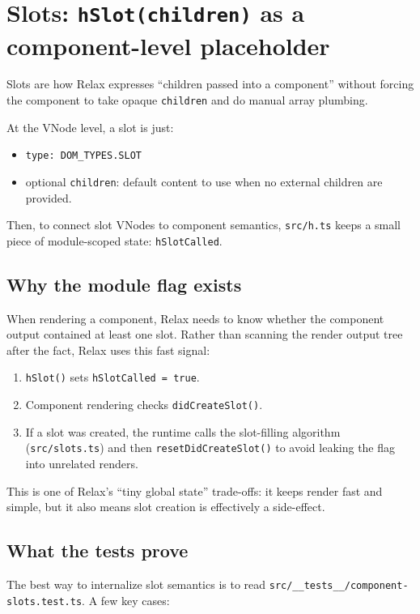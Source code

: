 \section{Slots: \texttt{hSlot(children)} as a component-level placeholder}
Slots are how Relax expresses ``children passed into a component'' without forcing the component to take opaque \texttt{children} and do manual array plumbing.

At the VNode level, a slot is just:

\begin{itemize}
  \item \texttt{type: DOM\_TYPES.SLOT}
  \item optional \texttt{children}: default content to use when no external children are provided.
\end{itemize}

Then, to connect slot VNodes to component semantics, \texttt{src/h.ts} keeps a small piece of module-scoped state: \texttt{hSlotCalled}.

\subsection*{Why the module flag exists}
When rendering a component, Relax needs to know whether the component output contained at least one slot. Rather than scanning the render output tree after the fact, Relax uses this fast signal:

\begin{enumerate}
  \item \texttt{hSlot()} sets \texttt{hSlotCalled = true}.
  \item Component rendering checks \texttt{didCreateSlot()}.
  \item If a slot was created, the runtime calls the slot-filling algorithm (\texttt{src/slots.ts}) and then \texttt{resetDidCreateSlot()} to avoid leaking the flag into unrelated renders.
\end{enumerate}

This is one of Relax's ``tiny global state'' trade-offs: it keeps render fast and simple, but it also means slot creation is effectively a side-effect.

\subsection*{What the tests prove}
The best way to internalize slot semantics is to read \texttt{src/\_\_tests\_\_/component-slots.test.ts}. A few key cases:

